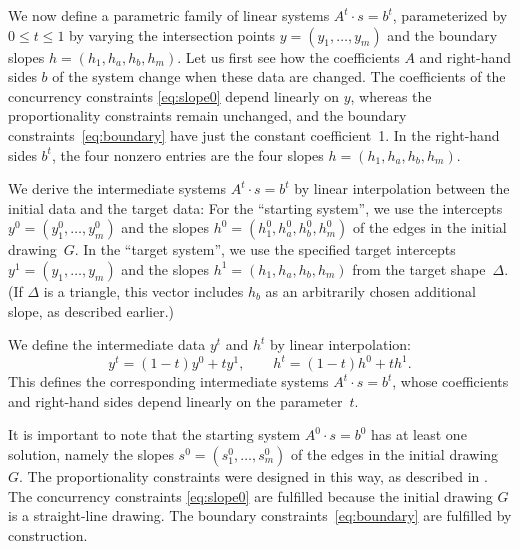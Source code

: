 We now define a parametric family of linear systems
 $A^t\cdot s = b^t$, parameterized by $0\le t\le 1$
 by varying the intersection points $y=(y_1,\ldots,y_m)$
 and the boundary slopes $h=(h_1,h_a,h_b,h_m)$.
 Let us first see how the coefficients $A$ and right-hand sides $b$ of the system change when these data are changed.
 The coefficients of the
 concurrency constraints
 \eqref{eq:slope0} depend linearly on $y$,
 whereas
 the
 proportionality constraints 
 \thetag{\ref{eq:proportion}--\ref{eq:proportion2}} remain unchanged,
 and the boundary constraints~\eqref{eq:boundary} have just the constant coefficient~1.
In the right-hand sides $b^t$,
the four nonzero entries
are the four slopes
$h=(h_1,h_a,h_b,h_m)$.

We derive the intermediate systems 
$A^t\cdot s = b^t$ by linear interpolation between the initial data
and the target data:
For the ``starting system'', we use
the intercepts
 $y^0=(y_1^0,\ldots,y_m^0)$
 and the slopes
 $h^0=(h_1^0,h_a^0,h_b^0,h_m^0)$
 of the edges in the initial drawing~$G$.
In the ``target system'', we use
the specified target intercepts
 $y^1=(y_1,\ldots,y_m)$
 and the slopes
 $h^1=(h_1,h_a,h_b,h_m)$ from the target shape~$\Delta$.
(If $\Delta$ is a triangle, this vector includes $h_b$ as an arbitrarily chosen
additional slope, as described earlier.)

 
We define the intermediate data $y^t$ and $h^t$
by linear interpolation:
\begin{equation*}
  y^t = (1-t)y^0 + ty^1,
  \qquad
  h^t = (1-t)h^0 + th^1.
\end{equation*}
This defines the corresponding intermediate systems 
$A^t\cdot s = b^t$, whose coefficients and right-hand sides depend
linearly on the parameter~$t$.

It is important to note that
the starting system
$A^0\cdot s = b^0$
has at least one solution, %
namely the slopes
$s^0=(s_1^0,\ldots,s_m^0)$
 of the edges in the initial drawing $G$.
 The proportionality constraints
  \thetag{\ref{eq:proportion}--\ref{eq:proportion2}} were designed
  in this way, as described in .
 The
 concurrency constraints
 \eqref{eq:slope0} are fulfilled because the initial drawing $G$ is a
 straight-line drawing.
 The boundary constraints~\eqref{eq:boundary} are fulfilled by
 construction.



